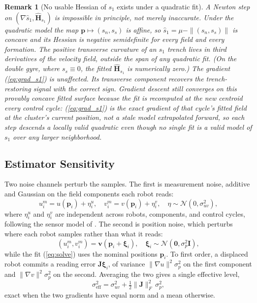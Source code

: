 \documentclass[lettersize,journal]{IEEEtran}
\newtheorem{remark}{Remark}
\begin{document}
\begin{remark}[No usable Hessian of $s_1$ exists under a quadratic fit]
\label{rem:s1hess}
A Newton step on $(\nabla \hat{s}_1,
\hat{\mathbf{H}}_{s_1})$ is impossible in principle, not merely
inaccurate. Under the quadratic model the map $\mathbf{p} \mapsto (s_n,
s_s)$ is affine, so $\hat{s}_1 = \mu - \|(s_n, s_s)\|$ is concave and its
Hessian is negative semidefinite \emph{for every field and every
formation}. The positive transverse curvature of an $s_1$ trench lives
in third derivatives of the velocity field, outside the span of any
quadratic fit. (On the double gyre, where $s_s \equiv 0$, the fitted
$\hat{\mathbf{H}}_{s_1}$ is numerically zero.) The gradient
(\ref{eq:grad_s1}) is unaffected. Its transverse component recovers the
trench-restoring signal with the correct sign. Gradient descent still
converges on this provably concave fitted surface because the fit is
recomputed at the new centroid every control cycle: (\ref{eq:grad_s1})
is the exact gradient of \emph{that} cycle's fitted field at the
cluster's current position, not a stale model extrapolated forward, so
each step descends a locally valid quadratic even though no single fit
is a valid model of $s_1$ over any larger neighborhood.
\end{remark}

\subsection{Estimator Sensitivity}
\label{sec:sensitivity}

Two noise channels perturb the samples. The first is measurement noise,
additive and Gaussian on the field components each robot reads:
\begin{equation}
    u_i^m = u(\mathbf{p}_i) + \eta_i^u, \quad
    v_i^m = v(\mathbf{p}_i) + \eta_i^v,
    \quad \eta \sim \mathcal{N}(0, \sigma_{uv}^2),
    \label{eq:meas_noise}
\end{equation}
where $\eta_i^u$ and $\eta_i^v$ are independent across robots,
components, and control cycles, following the sensor model of \cite{17}.
The second is position noise, which perturbs where each robot samples
rather than what it reads:
\begin{equation}
    (u_i^m, v_i^m) = \mathbf{v}(\mathbf{p}_i + \boldsymbol{\xi}_i), \quad
    \boldsymbol{\xi}_i \sim \mathcal{N}(\mathbf{0}, \sigma_p^2 \mathbf{I}),
    \label{eq:pos_noise}
\end{equation}
while the fit (\ref{eq:solve}) uses the nominal positions
$\mathbf{p}_i$. To first order, a displaced robot commits a reading
error $\mathbf{J}\boldsymbol{\xi}_i$, of variance
$\lVert\nabla u\rVert^2\sigma_p^2$ on the first component and
$\lVert\nabla v\rVert^2\sigma_p^2$ on the second. Averaging the two gives
a single effective level,
\begin{equation}
    \sigma_{\mathrm{eff}}^2 = \sigma_{uv}^2
        + \tfrac{1}{2}\lVert\mathbf{J}\rVert_F^2\,\sigma_p^2 ,
    \label{eq:sigma_eff}
\end{equation}
exact when the two gradients have equal norm and a mean otherwise.
\end{document}
